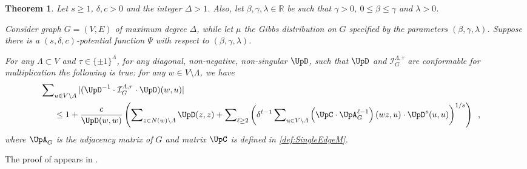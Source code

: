 \documentclass[11pt,reqno]{amsart}
\numberwithin{equation}{section}
\newtheorem{theorem}{Theorem}[section]
\newcommand{\cI}{{\mathcal{I}}}
\newcommand{\applegreen}[1]{ {\color{applegreen}#1}}
\newcommand{\blue}[1]{{\color{blue}#1}}
\newcommand{\cadmiumgreen}[1]{{\color{cadmiumgreen}#1}}
\newcommand{\darkmagenta}[1]{{\color{darkmagenta}#1}}
\newcommand{\red}[1]{{\color{red}#1}}
\newcommand{\maxDeg}{{\Delta}}
\newcommand{\potF}{{\Psi}}
\newcommand{\pfs}{\darkmagenta{s}}
\newcommand{\infmatrix}{\cI}
\newcommand{\abs}[1]{\blue{|}#1\blue{|}}
\newcommand{\Adjacency}{{\UpA}}
\newcommand{\EdgeToV}{\UpC}
\renewcommand{\applegreen}[1]{#1}
\renewcommand{\blue}[1]{#1}
\renewcommand{\cadmiumgreen}[1]{#1}
\renewcommand{\darkmagenta}[1]{#1}
\renewcommand{\red}[1]{#1}
\newcommand{\kell}{{\color{green(pigment)}\ell}}%
\newcommand{\ku}{\red{u}}
\newcommand{\kw}{\blue{w}}
\newcommand{\kz}{\cadmiumgreen{z}}
\renewcommand{\kell}{\ell}
\renewcommand{\ku}{u}
\renewcommand{\kw}{w}
\renewcommand{\kz}{z}
\begin{document}
 




\begin{theorem}\label{thrm:InflNormBound4GeneralD}
Let $\pfs\geq 1$, $\delta,c >0$ and the integer $\maxDeg>1$. Also, let 
$\beta,\gamma, \lambda\in \mathbb{R}$ be such that $\gamma >0$, $0\leq \beta\leq \gamma$ and $\lambda>0$. 

Consider graph $G=(V,E)$ of maximum degree $\maxDeg$, while let 
$\mu$ the Gibbs distribution on $G$ specified by the parameters $(\beta, \gamma, \lambda)$.
%
Suppose  there is a $(\pfs,\delta,c)$-potential function $\potF$ with respect to $(\beta,\gamma,\lambda)$. 

For any $\Lambda\subset V$ and $\tau\in \{\pm 1\}^{\Lambda}$, for any diagonal, non-negative, 
non-singular $\UpD$, such that $\UpD$ and $\infmatrix^{\Lambda, \tau}_G$ are conformable for multiplication
the following is true: for any $\kw \in V\setminus \Lambda$,  we have 
\begin{align}
\lefteqn{
 \sum\nolimits_{\ku \in V\setminus \Lambda } \abs{ ( \UpD^{-1}\cdot \infmatrix^{\Lambda, \tau}_G\cdot \UpD ) (\kw,\ku) }
} \hspace{.5cm}  \label{eq:Target4thrm:InflNormBound4GeneralD} \\
%
&\leq 1+  
 \frac{c}{\UpD(\kw,\kw) } \left( \sum\nolimits_{\kz \in N(\kw)\setminus \Lambda} \UpD(\kz,\kz)+ \sum\nolimits_{\kell \geq 2} \left( \delta^{\kell-1} \sum\nolimits_{\ku \in V\setminus \Lambda}
\left(\EdgeToV\cdot \Adjacency^{\kell-1}_G\right)(\kw\kz, \ku) 
\cdot \UpD^{\pfs}(\ku,\ku)
\right)^{{1}/{\pfs}} \right)
\enspace,  \nonumber 
\end{align}
where $\Adjacency_G$ is the adjacency matrix of $G$ and matrix $\EdgeToV$ is defined in \eqref{def:SingleEdgeM}.
\end{theorem} 
%
The proof of  appears in . 





\newcommand{\Pweight}{{\UpW}}
%
\end{document}
